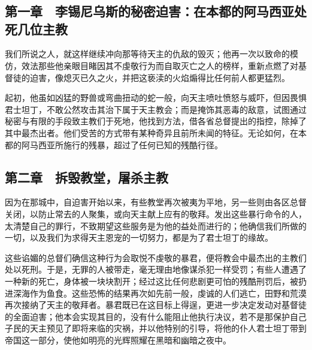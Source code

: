 
\section{}


\subsection{第一章　李锡尼乌斯的秘密迫害：在本都的阿马西亚处死几位主教}

我们所说之人，就这样继续冲向那等待天主的仇敌的毁灭；他再一次以致命的模仿，效法那些他亲眼目睹因其不虔敬行为而自取灭亡之人的榜样，重新点燃了对基督徒的迫害，像熄灭已久之火，并把这亵渎的火焰煽得比任何前人都更猛烈。\par

起初，他虽如凶猛的野兽或弯曲扭动的蛇一般，向天主喷吐愤怒与威吓，但因畏惧君士坦丁，不敢公然攻击其治下属于天主教会；而是掩饰其恶毒的敌意，试图通过秘密与有限的手段致主教们于死地，他找到方法，借各省总督提出的指控，除掉了其中最杰出者。他们受苦的方式带有某种奇异且前所未闻的特征。无论如何，在本都的阿马西亚所施行的残暴，超过了任何已知的残酷行径。\par


\subsection{第二章　拆毁教堂，屠杀主教}

因为在那城中，自迫害开始以来，有些教堂再次被夷为平地，另一些则由各区总督关闭，以防止常去的人聚集，或向天主献上应有的敬拜。发出这些暴行命令的人，太清楚自己的罪行，不致期望这些服务是为他的益处而进行的；他确信我们所做的一切，以及我们为求得天主恩宠的一切努力，都是为了君士坦丁的缘故。\par

这些谄媚的总督们确信这种行为会取悦不虔敬的暴君，便将教会中最杰出的主教们处以死刑。于是，无罪的人被带走，毫无理由地像谋杀犯一样受罚；有些人遭遇了一种新的死亡，身体被一块块割开；经过这比任何悲剧更可怕的残酷刑罚后，被扔进深海作为鱼食。这些恐怖的结果再次如先前一般，虔诚的人们逃亡，田野和荒漠再次接纳了天主的敬拜者。暴君既已在这目标上得逞，更进一步决定发动对基督徒的全面迫害；他本会实现其目的，没有什么能阻止他执行决议，若不是那保护自己子民的天主预见了即将来临的灾祸，并以他特别的引导，将他的仆人君士坦丁带到帝国这一部分，使他如明亮的光辉照耀在黑暗和幽暗之夜中。\par

